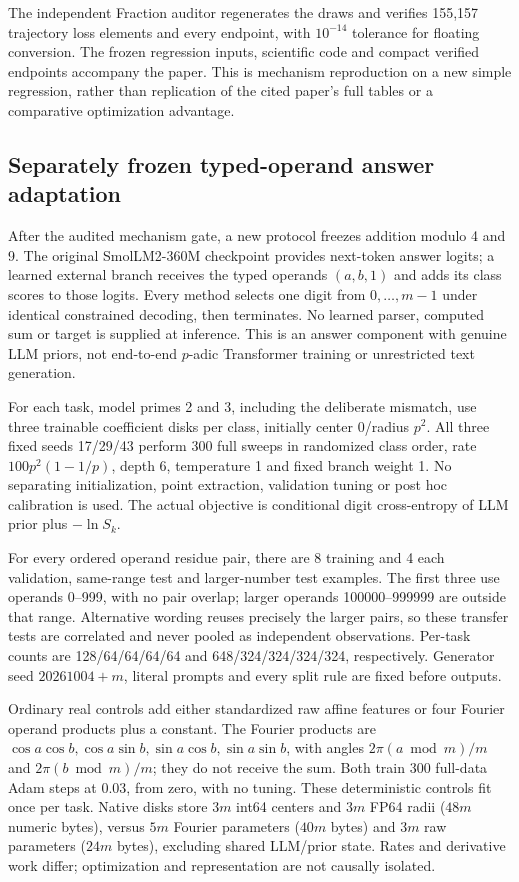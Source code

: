\documentclass[11pt]{article}
\begin{document}
The independent Fraction auditor regenerates the draws and verifies 155,157
trajectory loss elements and every endpoint, with \(10^{-14}\) tolerance
for floating conversion. The frozen regression inputs, scientific code
and compact verified endpoints accompany the paper.
This is mechanism reproduction on a new simple regression, rather than
replication of the cited paper's full tables or a comparative optimization
advantage.

\subsection{Separately frozen typed-operand answer adaptation}

After the audited mechanism gate, a new protocol freezes addition modulo 4
and 9. The original SmolLM2-360M checkpoint provides next-token answer logits;
a learned external branch receives the typed operands \((a,b,1)\) and adds
its class scores to those logits. Every method selects one digit from
\(0,\ldots,m-1\) under identical constrained decoding, then terminates.
No learned parser, computed sum or target is supplied at inference. This is
an answer component with genuine LLM priors, not end-to-end \(p\)-adic
Transformer training or unrestricted text generation.

For each task, model primes 2 and 3, including the deliberate mismatch,
use three trainable coefficient disks per class, initially center 0/radius
\(p^2\). All three fixed seeds 17/29/43 perform 300 full sweeps in randomized
class order, rate \(100p^2(1-1/p)\), depth 6, temperature 1 and fixed branch
weight 1. No separating initialization, point extraction, validation tuning
or post hoc calibration is used. The actual objective is conditional digit
cross-entropy of LLM prior plus \(-\ln S_k\).

For every ordered operand residue pair, there are 8 training and 4 each
validation, same-range test and larger-number test examples. The first three
use operands 0--999, with no pair overlap; larger operands 100000--999999
are outside that range. Alternative wording reuses precisely the larger
pairs, so these transfer tests are correlated and never pooled as independent
observations. Per-task counts are 128/64/64/64/64 and
648/324/324/324/324, respectively. Generator seed \(20261004+m\), literal
prompts and every split rule are fixed before outputs.

Ordinary real controls add either standardized raw affine features or four
Fourier operand products plus a constant. The Fourier products are
\(\cos a\cos b,\cos a\sin b,\sin a\cos b,\sin a\sin b\), with angles
\(2\pi(a\bmod m)/m\) and \(2\pi(b\bmod m)/m\); they do not receive the sum.
Both train 300 full-data Adam steps at 0.03, from zero, with no tuning.
These deterministic controls fit once per task. Native disks store
\(3m\) int64 centers and \(3m\) FP64 radii (\(48m\) numeric bytes), versus
\(5m\) Fourier parameters (\(40m\) bytes) and \(3m\) raw parameters
(\(24m\) bytes), excluding shared LLM/prior state. Rates and derivative
work differ; optimization and representation are not causally isolated.
\end{document}
